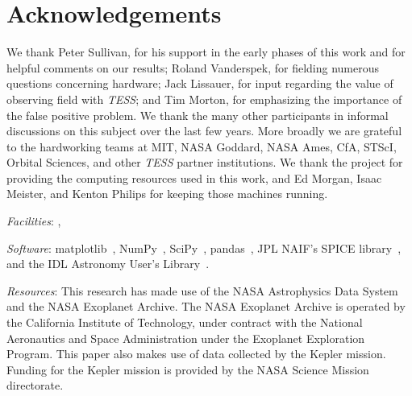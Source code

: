 \section*{Acknowledgements}
We thank Peter Sullivan, for his support in the early phases of this 
work and for helpful comments on our results;
Roland Vanderspek, for fielding numerous questions concerning \tess hardware; 
Jack Lissauer, for input regarding the value of observing \keplers field with 
\textit{TESS};
and Tim Morton, for emphasizing the importance of the false positive problem.
We thank the many other participants in informal discussions on this subject over the last few years.
More broadly we are grateful to the hardworking teams 
at MIT, NASA Goddard, NASA Ames, CfA, STScI, Orbital Sciences, and other \textit{TESS} partner institutions.
We thank the \tess project for providing the computing resources used in this work, and Ed 
Morgan, Isaac Meister, and Kenton Philips for keeping those machines running.

\vspace{0.5cm}
\textit{Facilities}: \tess\!, \kepler

\textit{Software}: matplotlib~\citep{hunter_matplotlib_2007}, NumPy~\citep{walt_numpy_2011}, SciPy~\citep{jones_scipy_2001}, pandas~\citep{mckinneypandas}, JPL NAIF's SPICE library~\citep{acton_SPICE_1996}, and the IDL Astronomy User's Library~\citep{landsman_idl_1995}.

\textit{Resources}: This research has made use of the NASA Astrophysics Data System and the NASA Exoplanet Archive. The NASA Exoplanet Archive is operated by the California Institute of Technology, under contract with the National Aeronautics and Space Administration under the Exoplanet Exploration Program.
This paper also makes use of data collected by the Kepler mission. Funding for the Kepler mission is provided by the NASA Science Mission directorate.
